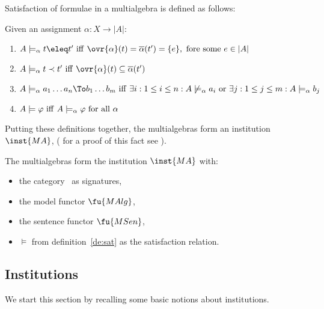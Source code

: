 Satisfaction of formulae in a multialgebra is defined as follows:
\begin{definition}\label{de:sat}
Given an assignment $\alpha:X\to|A|$:
\begin{enumerate}
\item $A \models_\alpha t \eleq  t'\ {\rm iff\ } \ovr{\alpha}(t)
=\overline{\alpha}(t') = \{e\},\ {\rm fore\ some\ } e \in |A|$
\item $A \models_\alpha t \prec t'\ {\rm iff\ } \ovr{\alpha}(t) \subseteq \overline{\alpha}(t')$
\item $ A \models_\alpha a_1 \ldots a_n \To b_1 \ldots b_m\ {\rm iff\ }
\exists i: 1 \leq i \leq n : A \not\models_\alpha a_i\ {\rm or\ } \exists j: 1 \leq j \leq m : A \models_\alpha b_j$
\item $A \models \varphi\ {\rm iff\ } A \models_\alpha \varphi\ {\rm for\ all\ } \alpha$
\end{enumerate}
\end{definition}
%
Putting these definitions together, the multialgebras form an institution
$\inst{MA}$, ( for a proof of this fact see \cite{partial}).
\begin{fact} The multialgebras form the institution $\inst{MA}$ with:
	\begin{itemize}
	\item the category \Sign\ as signatures,
	\item the model functor $\fu{MAlg}$,
	\item the sentence functor $\fu{MSen}$,
	\item $\models$ from definition~\ref{de:sat} as the satisfaction relation.
	\end{itemize}
\end{fact}



\subsection{Institutions}
\label{se:inst}

We start this section by recalling some basic notions about institutions.
 

